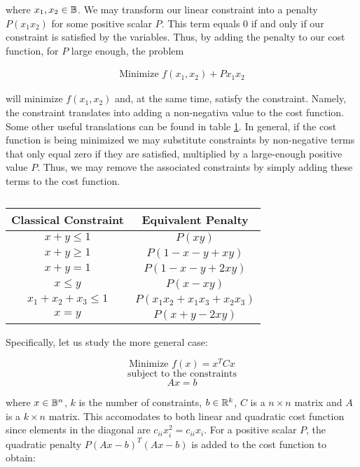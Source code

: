 where $x_1, x_2 \in \mathbb{B}$. We may transform our linear constraint into a penalty $P(x_1x_2)$ for some positive scalar $P$. This term equals $0$ if and only if our constraint is satisfied by the variables. Thus, by adding the penalty to our cost function, for $P$ large enough, the problem

\begin{gather*}
	\text{Minimize } f(x_1, x_2) + Px_1x_2
\end{gather*}

will minimize $f(x_1, x_2)$ and, at the same time, satisfy the constraint. Namely, the constraint translates into adding a non-negativa value to the cost function. Some other useful translations can be found in table \ref{penalties-table}. In general, if the cost function is being minimized we may substitute constraints by non-negative terms that only equal zero if they are satisfied, multiplied by a large-enough positive value $P$. Thus, we may remove the associated constraints by simply adding these terms to the cost function. 

\begin{table}[h]
	\centering
	\begin{tabular}{cc}
		Classical Constraint 		& Equivalent Penalty   			\\ \hline
		$x + y \leq 1$       		& $P(xy)$              			\\
		$x + y \geq 1$       		& $P(1 - x - y + xy)$  			\\
		$x + y = 1$          		& $P(1 - x - y + 2xy)$ 			\\
		$x \leq y$       			& $P(x - xy)$      
		
		   			\\
		$x_1 + x_2 + x_3 \leq 1$	& $P(x_1x_2 + x_1x_3 + x_2x_3)$	\\
		$x = y$              		& $P(x + y - 2xy)$    
	\end{tabular}
	\caption{}
	\label{penalties-table}
\end{table}

Specifically, let us study the more general case:

$$ \text{Minimize } f(x) = x^T C x $$
$$ \text{subject to the constraints} $$
$$ Ax = b $$

where $x \in \mathbb{B}^n$, $k$ is the number of constraints, $b \in \mathbb{R}^k$, $C$ is a $n \times n$ matrix and $A$ is a $k \times n$ matrix. This accomodates to both linear and quadratic cost function since elements in the diagonal are $c_{ii} x_i^2 = c_{ii} x_i$. For a positive scalar $P$, the quadratic penalty $P (Ax - b)^T (Ax - b)$ is added to the cost function to obtain:

